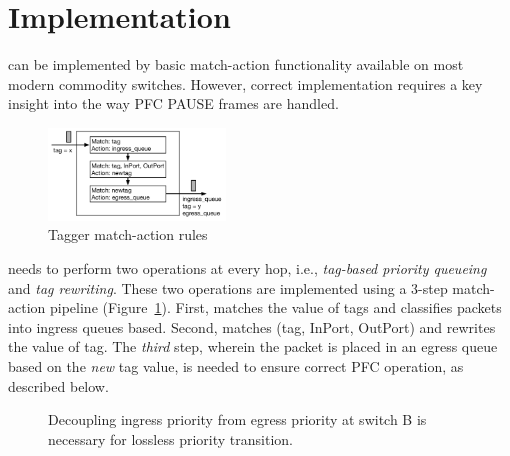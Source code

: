 \section{Implementation}\label{sec:implementation}

\sysname{} can be implemented by basic match-action functionality
available on most modern commodity switches. However, correct implementation
requires a key insight into the way PFC PAUSE frames are handled.

\begin{figure}
	\hspace{-0.2in}
	\centering
	\includegraphics[width=0.42\textwidth] {figs/Tagger}
	\caption{Tagger match-action rules}\label{fig:tagger}
	\vspace{-2em}
\end{figure}

 \sysname{} needs to perform two operations at every
hop, i.e., {\em tag-based priority queueing} and {\em tag
rewriting}.  These two operations are implemented using a 3-step match-action
pipeline (Figure~\ref{fig:tagger}).  First, \sysname{} matches
the value of tags and classifies packets into ingress queues based. Second, 
\sysname{} matches (tag, InPort, OutPort) and rewrites the value of tag. 
The {\em third} step, wherein the packet is placed in an egress queue based on the
{\em new} tag value, is needed to ensure correct PFC operation, as described below.

\begin{figure}[t]
 	\centering
  
 	\caption{Decoupling ingress priority from egress priority at switch B is necessary for lossless priority transition.}\label{fig:prioritydecoupling}
\end{figure}


